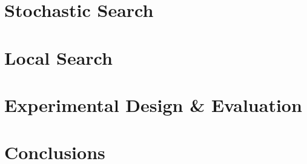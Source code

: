 \documentclass[journal]{IEEEtran}
\begin{document}
\section{Stochastic Search}\label{sec:stochastic}


\section{Local Search}\label{sec:local}


\section{Experimental Design \& Evaluation}\label{sec:experiment}


\section{Conclusions}\label{sec:conclusions}





\appendices

\end{document}
